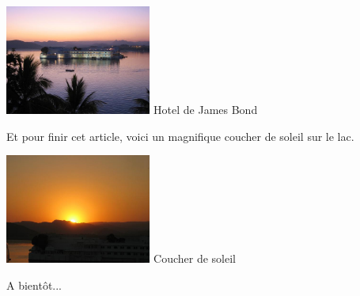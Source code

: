 \begin{multicols}{2}
\hspace*{-0.65cm}
\includegraphics[width=4.8cm]{articles/Octopussy/octopussy.jpg}
Hotel de James Bond

Et pour finir cet article, voici un magnifique coucher de soleil sur le lac.

\hspace*{-0.65cm}
\includegraphics[width=4.8cm]{articles/Octopussy/soleil.jpg}
Coucher de soleil

A bientôt...

\end{multicols}
